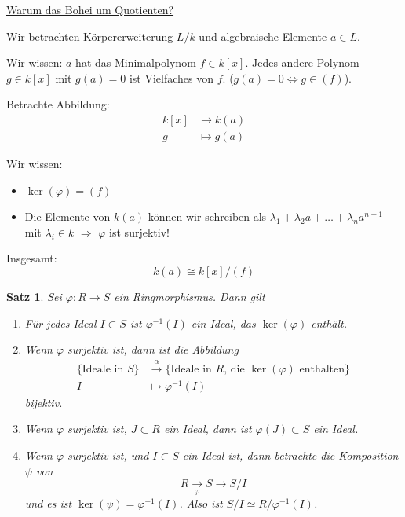 \documentclass[a4paper,12pt,numbers=noenddot,parskip=full]{scrartcl}
\newcommand{\heading}{\underline}
\theoremstyle{dotless}
\newtheorem{theorem}{Satz}[section]
\theoremstyle{remark}
\begin{document}
	\heading{Warum das Bohei um Quotienten?}
	
	Wir betrachten Körpererweiterung $L/k$ und algebraische Elemente $a \in L$.
	
	Wir wissen: $a$ hat das Minimalpolynom $f \in k[x]$. Jedes andere Polynom $g \in k[x]$ mit $g(a) = 0$ ist Vielfaches von $f$. ($g(a) = 0 \Leftrightarrow g \in (f)$).
	
	Betrachte Abbildung:
	\begin{align*}
		k[x] &\to k(a) \\
		g &\mapsto g(a)
	\end{align*}
	
	Wir wissen:
	\begin{itemize}
		\item $\ker(\varphi) = (f)$
		\item Die Elemente von $k(a)$ können wir schreiben als $\lambda_1 + \lambda_2 a + \dots + \lambda_n a^{n-1}$ mit $\lambda_i \in k$ $\Rightarrow$ $\varphi$ ist surjektiv!
	\end{itemize}

	Insgesamt:
	\begin{equation*}
		k(a) \cong k[x]/(f)
	\end{equation*}

	\begin{theorem}
		Sei $\varphi: R \to S$ ein Ringmorphismus. Dann gilt
		\begin{enumerate}
			\item Für jedes Ideal $I \subset S$ ist $\varphi^{-1}(I)$ ein Ideal, das $\ker(\varphi)$ enthält.
			\item Wenn $\varphi$ surjektiv ist, dann ist die Abbildung 
			\begin{align*}
				\{ \text{Ideale in $S$} \} &\overset{\alpha}{\to} \{ \text{Ideale in $R$, die $\ker(\varphi)$ enthalten} \} \\
				I &\mapsto \varphi^{-1}(I)
			\end{align*}
			bijektiv.
			\item Wenn $\varphi$ surjektiv ist, $J \subset R$ ein Ideal, dann ist $\varphi(J) \subset S$ ein Ideal.
			\item Wenn $\varphi$ surjektiv ist, und $I \subset S$ ein Ideal ist, dann betrachte die Komposition $\psi$ von
			\begin{equation*}
				R \underset{\varphi}{\to} S \to S/I
			\end{equation*}
			und es ist $\ker(\psi) = \varphi^{-1}(I)$. Also ist $S/I \simeq R/\varphi^{-1}(I)$.
		\end{enumerate}
	\end{theorem}
\end{document}
